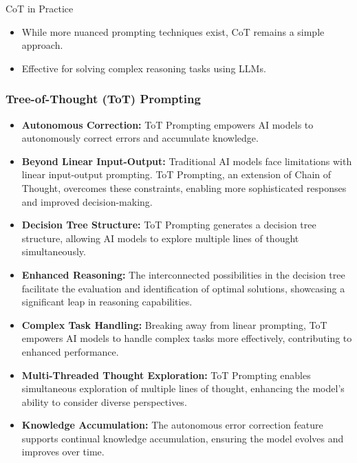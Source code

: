\begin{frame}[fragile]{CoT in Practice}
    \begin{itemize}
        \item While more nuanced prompting techniques exist, CoT remains a simple approach.
        \item Effective for solving complex reasoning tasks using LLMs.
    \end{itemize}
\end{frame}



\begin{frame}[fragile]\frametitle{Tree-of-Thought (ToT) Prompting}

\begin{itemize}
  \item \textbf{Autonomous Correction:} ToT Prompting empowers AI models to autonomously correct errors and accumulate knowledge.
  
  \item \textbf{Beyond Linear Input-Output:} Traditional AI models face limitations with linear input-output prompting. ToT Prompting, an extension of Chain of Thought, overcomes these constraints, enabling more sophisticated responses and improved decision-making.
  
  \item \textbf{Decision Tree Structure:} ToT Prompting generates a decision tree structure, allowing AI models to explore multiple lines of thought simultaneously.
  
  \item \textbf{Enhanced Reasoning:} The interconnected possibilities in the decision tree facilitate the evaluation and identification of optimal solutions, showcasing a significant leap in reasoning capabilities.
  
  \item \textbf{Complex Task Handling:} Breaking away from linear prompting, ToT empowers AI models to handle complex tasks more effectively, contributing to enhanced performance.
  
  \item \textbf{Multi-Threaded Thought Exploration:} ToT Prompting enables simultaneous exploration of multiple lines of thought, enhancing the model's ability to consider diverse perspectives.
  
  \item \textbf{Knowledge Accumulation:} The autonomous error correction feature supports continual knowledge accumulation, ensuring the model evolves and improves over time.
  

\end{itemize}
\end{frame}

